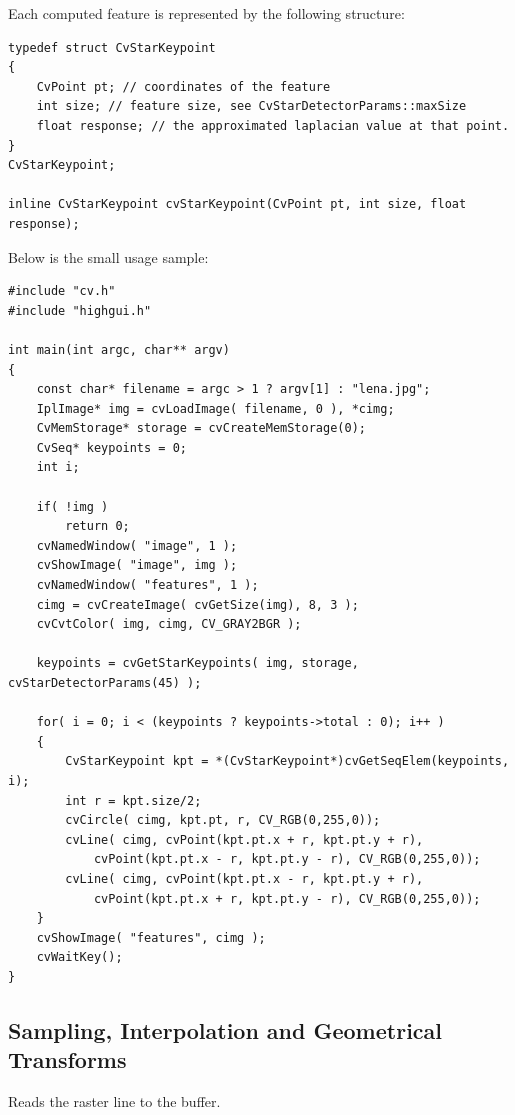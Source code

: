 Each computed feature is represented by the following structure:

\begin{lstlisting}
typedef struct CvStarKeypoint
{
    CvPoint pt; // coordinates of the feature
    int size; // feature size, see CvStarDetectorParams::maxSize
    float response; // the approximated laplacian value at that point.
}
CvStarKeypoint;

inline CvStarKeypoint cvStarKeypoint(CvPoint pt, int size, float response);
\end{lstlisting}

Below is the small usage sample:

\begin{lstlisting}
#include "cv.h"
#include "highgui.h"

int main(int argc, char** argv)
{
    const char* filename = argc > 1 ? argv[1] : "lena.jpg";
    IplImage* img = cvLoadImage( filename, 0 ), *cimg;
    CvMemStorage* storage = cvCreateMemStorage(0);
    CvSeq* keypoints = 0;
    int i;

    if( !img )
        return 0;
    cvNamedWindow( "image", 1 );
    cvShowImage( "image", img );
    cvNamedWindow( "features", 1 );
    cimg = cvCreateImage( cvGetSize(img), 8, 3 );
    cvCvtColor( img, cimg, CV_GRAY2BGR );

    keypoints = cvGetStarKeypoints( img, storage, cvStarDetectorParams(45) );

    for( i = 0; i < (keypoints ? keypoints->total : 0); i++ )
    {
        CvStarKeypoint kpt = *(CvStarKeypoint*)cvGetSeqElem(keypoints, i);
        int r = kpt.size/2;
        cvCircle( cimg, kpt.pt, r, CV_RGB(0,255,0));
        cvLine( cimg, cvPoint(kpt.pt.x + r, kpt.pt.y + r),
            cvPoint(kpt.pt.x - r, kpt.pt.y - r), CV_RGB(0,255,0));
        cvLine( cimg, cvPoint(kpt.pt.x - r, kpt.pt.y + r),
            cvPoint(kpt.pt.x + r, kpt.pt.y - r), CV_RGB(0,255,0));
    }
    cvShowImage( "features", cimg );
    cvWaitKey();
}
\end{lstlisting}

\subsection{Sampling, Interpolation and Geometrical Transforms}

\label{SampleLine}
Reads the raster line to the buffer.


